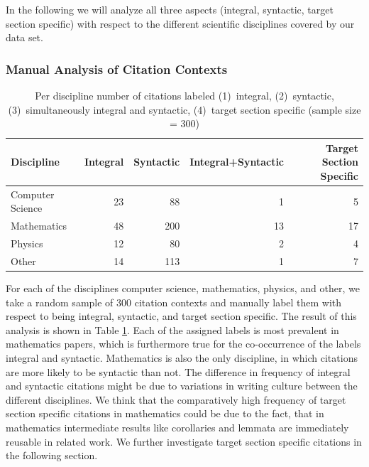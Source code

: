 In the following we will analyze all three aspects (integral, syntactic, target section specific) with respect to the different scientific disciplines covered by our data set.

\subsubsection{Manual Analysis of Citation Contexts}

\begin{table}[tb]
\centering
  \caption[Per discipline number of citations labeled integral, syntactic, imultaneously integral and syntactic, target section specific]{Per discipline number of citations labeled (1)~integral, (2)~syntactic, (3)~simultaneously integral and syntactic, (4)~target section specific (sample size = 300)}
  \label{tbl:integralsyntacticsecspec}
\begin{small}
\begin{tabular}{lrrrr}
\toprule
   Discipline & Integral & Syntactic & Integral+Syntactic & Target Section Specific \\
   \midrule
   Computer Science & 23 & 88 & 1 & 5 \\
   Mathematics & 48 & 200 & 13 & 17 \\
   Physics & 12 & 80 & 2 & 4 \\
   Other & 14 & 113 & 1 & 7 \\
  \bottomrule
\end{tabular}
\end{small}
\end{table}

For each of the disciplines computer science, mathematics, physics, and other, we take a random sample of 300 citation contexts and manually label them with respect to being integral, syntactic, and target section specific. The result of this analysis is shown in Table \ref{tbl:integralsyntacticsecspec}. Each of the assigned labels is most prevalent in mathematics papers, which is furthermore true for the co-occurrence of the labels integral and syntactic. Mathematics is also the only discipline, in which citations are more likely to be syntactic than not. The difference in frequency of integral and syntactic citations might be due to variations in writing culture between the different disciplines. We think that the comparatively high frequency of target section specific citations in mathematics could be due to the fact, that in mathematics intermediate results like corollaries and lemmata are immediately reusable in related work. We further investigate target section specific citations in the following section.


